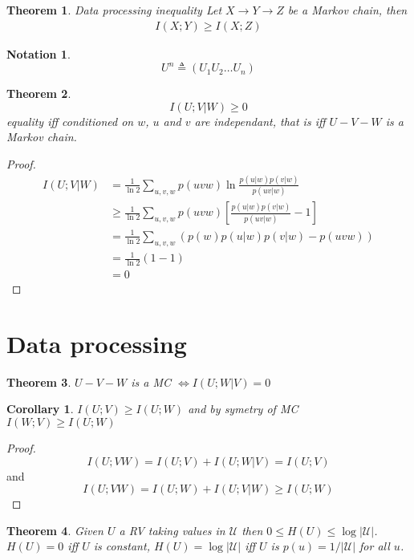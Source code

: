 \documentclass{article}
\newtheorem{theorem}{Theorem}[section]
\newtheorem{corollary}{Corollary}[theorem]
\newtheorem{notation}{Notation}
\theoremstyle{definition} %
\def\U{\mathcal{U}}
\begin{document}
\begin{theorem}{Data processing inequality}
  Let $X \rightarrow Y \rightarrow Z$ be a Markov chain, then
  \begin{align*}
    I(X ; Y) \geq I(X ; Z)
  \end{align*}
\end{theorem}

\begin{notation}
  \[
    U^n \triangleq (U_1 U_2 \dots U_n)
  \]
\end{notation}

\begin{theorem}
  \[
    I(U;V |W) \geq 0
  \]
  equality iff conditioned on $w$, $u$ and $v$ are independant, that is iff $U-V-W$ is a Markov chain.
\end{theorem}


\begin{proof}
  \begin{align*}
    I(U;V|W) &= \frac 1 {\ln 2} \sum_{u,v,w} p(uvw) \ln \frac {p(u|w)p(v|w)} {p(uv | w)}\\
    &\geq \frac 1 {\ln 2} \sum_{u,v,w} p(uvw) \left[ \frac {p(u|w)p(v|w)} {p(uv | w)} - 1 \right]\\
    &=\frac 1 {\ln 2} \sum_{u,v,w}(p(w)p(u|w)p(v|w) - p(uvw))\\
    &= \frac 1 {\ln 2}(1 - 1) \\
    &=0
  \end{align*}
\end{proof}

\newpage
\section{Data processing}

\begin{theorem}
  $U-V-W$ is a MC $\iff I(U;W|V) = 0$
\end{theorem}

\begin{corollary}
  $I(U;V) \geq I(U;W)$ and by symetry of MC $I(W;V) \geq I(U;W)$
\end{corollary}

\begin{proof}
  \[
    I(U;VW) = I(U;V) + I(U;W|V) = I(U;V)
  \]
  and
  \[
    I(U;VW) = I(U;W) + I(U;V|W) \geq I(U;W)
  \]
\end{proof}

\begin{theorem}
  Given $U$ a RV taking values in $\U$ then $0 \leq H(U) \leq \log | \U |$. $H(U)=0$ iff $U$ is constant, $H(U)=\log | \U |$ iff $U$ is $p(u) = 1 / |\U|$ for all $u$.
\end{theorem}
\end{document}
